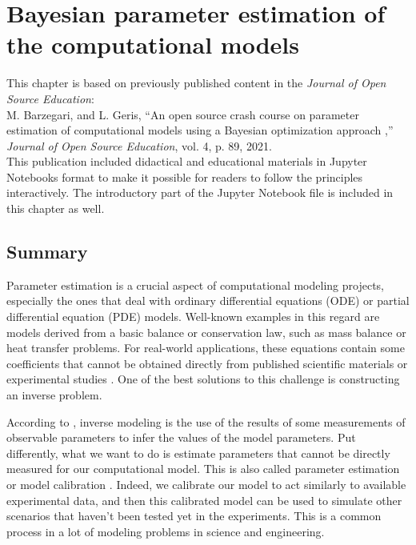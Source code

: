 \chapter{Bayesian parameter estimation of the computational models}\label{ch:bayesian}

\begin{shaded}
This chapter is based on previously published content in the \textit{Journal of Open Source Education}:\\
M. Barzegari, and L. Geris, ``An open source crash course on parameter estimation of computational models using a Bayesian optimization approach
,'' \textit{Journal of Open Source Education}, vol. 4, p. 89, 2021.\\
This publication included didactical and educational materials in Jupyter Notebooks format to make it possible for readers to follow the principles interactively. The introductory part of the Jupyter Notebook file is included in this chapter as well.
\end{shaded}

\section{Summary}

Parameter estimation is a crucial aspect of computational modeling projects, especially the ones that deal with ordinary differential equations (ODE) or partial differential equation (PDE) models. Well-known examples in this regard are models derived from a basic balance or conservation law, such as mass balance or heat transfer problems. For real-world applications, these equations contain some coefficients that cannot be obtained directly from published scientific materials or experimental studies \cite{Dehghan2001}. One of the best solutions to this challenge is constructing an inverse problem.

According to \cite{Tarantola1987}, inverse modeling is the use of the results of some measurements of observable parameters to infer the values of the model parameters. Put differently, what we want to do is estimate parameters that cannot be directly measured for our computational model. This is also called parameter estimation or model calibration \cite{Carson2014}. Indeed, we calibrate our model to act similarly to available experimental data, and then this calibrated model can be used to simulate other scenarios that haven't been tested yet in the experiments. This is a common process in a lot of modeling problems in science and engineering.

